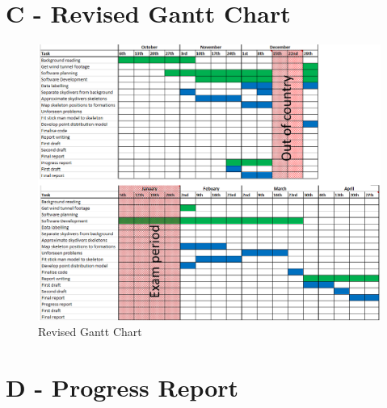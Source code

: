 \documentclass[a4paper, 12pt]{article}
\begin{document}
\begin{appendices}
\chapter{\textbf{C - Revised Gantt Chart}}
\label{appendix:revised_gantt}
%
\begin{figure}[H]
	\centering
	\includegraphics[width=\linewidth]{Gantt_new_split.png}
	\caption{Revised Gantt Chart}
	\label{fig:gantt_new}
\end{figure}
%
%
\chapter{\textbf{D - Progress Report}}
\label{appendix:progress_report}

\end{appendices}
%
\end{document}

